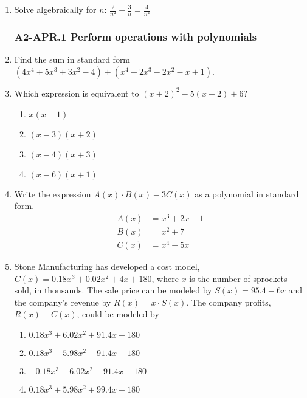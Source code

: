 \documentclass[12pt, twoside]{article}
\begin{document}
\begin{enumerate}[itemsep=0.5cm]
\item Solve algebraically for $n$: $\displaystyle \frac{2}{n^2} + \frac{3}{n} = \frac{4}{n^2}$ %
\vspace{4cm}

\newpage 
\subsubsection*{A2-APR.1 Perform operations with polynomials}
\item Find the sum in standard form $(4x^4+5x^3+3x^2-4) + (x^4-2x^3-2x^2-x+1)$. \vspace{8cm}

\item Which expression is equivalent to $(x + 2)^2 - 5(x + 2) + 6$?
\begin{enumerate}
    \item $x(x - 1)$
    \item $(x - 3)(x + 2)$
    \item $(x - 4)(x + 3)$
    \item $(x - 6)(x + 1)$
\end{enumerate}

\newpage
\item Write the expression $A(x) \cdot B(x) - 3C(x)$ as a polynomial in standard form. %
\begin{align*}
    A(x) &= x^3 + 2x - 1 \\
    B(x) &= x^2 + 7 \\
    C(x) &= x^4 - 5x
\end{align*} \vspace{6cm}

\item Stone Manufacturing has developed a cost model, $C(x) = 0.18x^3 + 0.02x^2 + 4x + 180$, where $x$ is the number of sprockets sold, in thousands. The sale price can be modeled by $S(x) = 95.4 - 6x$ and the company’s revenue by $R(x) = x \cdot S(x)$. The company profits, $R(x) - C(x)$, could be modeled by %
\begin{enumerate}
    \item $0.18x^3 + 6.02x^2 + 91.4x + 180$
    \item $0.18x^3 - 5.98x^2 - 91.4x + 180$
    \item $-0.18x^3 - 6.02x^2 + 91.4x - 180$
    \item $0.18x^3 + 5.98x^2 + 99.4x + 180$
\end{enumerate}


\end{enumerate}
\end{document}
